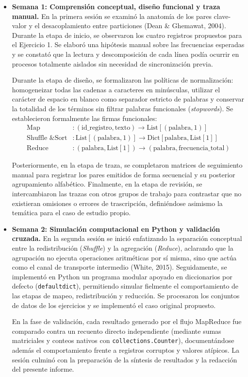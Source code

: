 \documentclass[12pt,a4paper]{article}
\begin{document}
\begin{itemize}
    \item \textbf{Semana 1: Comprensión conceptual, diseño funcional y traza manual.}
    En la primera sesión se examinó la anatomía de los pares clave-valor y el desacoplamiento entre particiones (Dean \& Ghemawat, 2004). Durante la etapa de inicio, se observaron los cuatro registros propuestos para el Ejercicio 1. Se elaboró una hipótesis manual sobre las frecuencias esperadas y se constató que la lectura y descomposición de cada línea podía ocurrir en procesos totalmente aislados sin necesidad de sincronización previa.
    
    Durante la etapa de diseño, se formalizaron las políticas de normalización: homogeneizar todas las cadenas a caracteres en minúsculas, utilizar el carácter de espacio en blanco como separador estricto de palabras y conservar la totalidad de los términos sin filtrar palabras funcionales (\textit{stopwords}). Se establecieron formalmente las firmas funcionales:
    \begin{align*}
        \text{Map}&: (\text{id\_registro}, \text{texto}) \longrightarrow \text{List}[(\text{palabra}, 1)] \\
        \text{Shuffle \& Sort}&: \text{List}[(\text{palabra}, 1)] \longrightarrow \text{Dict}[\text{palabra}, \text{List}[1]] \\
        \text{Reduce}&: (\text{palabra}, \text{List}[1]) \longrightarrow (\text{palabra}, \text{frecuencia\_total})
    \end{align*}
    
    Posteriormente, en la etapa de traza, se completaron matrices de seguimiento manual para registrar los pares emitidos de forma secuencial y su posterior agrupamiento alfabético. Finalmente, en la etapa de revisión, se intercambiaron las trazas con otros grupos de trabajo para contrastar que no existieran omisiones o errores de trascripción, definiéndose asimismo la temática para el caso de estudio propio.

    \item \textbf{Semana 2: Simulación computacional en Python y validación cruzada.}
    En la segunda sesión se inició enfatizando la separación conceptual entre la redistribución (\textit{Shuffle}) y la agregación (\textit{Reduce}), aclarando que la agrupación no ejecuta operaciones aritméticas por sí misma, sino que actúa como el canal de transporte intermedio (White, 2015). Seguidamente, se implementó en Python un programa modular apoyado en diccionarios por defecto (\texttt{defaultdict}), permitiendo simular fielmente el comportamiento de las etapas de mapeo, redistribución y reducción. Se procesaron los conjuntos de datos de los ejercicios y se implementó el caso original propuesto.
    
    En la fase de validación, cada resultado generado por el flujo MapReduce fue comparado contra un recuento directo independiente (mediante sumas matriciales y conteos nativos con \texttt{collections.Counter}), documentándose además el comportamiento frente a registros corruptos y valores atípicos. La sesión culminó con la preparación de la síntesis de resultados y la redacción del presente informe.
\end{itemize}
\end{document}
